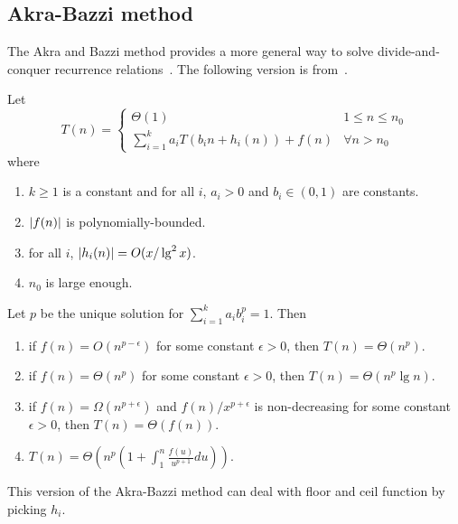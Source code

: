\subsection{Akra\--Bazzi method}
The Akra and Bazzi method provides a more general way to solve divide-and-conquer recurrence relations~\cite{Akra1998}. The following version is from~\cite{Leighton1996}.
\begin{theorem}
Let \[T(n) = 
\begin{cases}
\Theta(1)& 1 \leq n \leq n_0 \\
\sum_{i=1}^k a_iT(b_in +h_i(n)) + f(n) &\forall n > n_0
\end{cases}\]
where
\begin{enumerate}
\item $k \geq 1$ is a constant and for all $i$, $a_i > 0$ and $b_i \in (0, 1)$ are constants.
\item $\lvert f(n)\rvert$ is polynomially-bounded.
\item for all $i$, $\lvert h_i(n)\rvert = O(x /\lg^2x)$.
\item $n_0$ is large enough.
\end{enumerate}
Let $p$ be the unique solution for $\sum_{i=1}^k a_ib_i^p = 1$. Then
\begin{enumerate}
\item if $f(n) = O(n^{p-\epsilon})$ for some constant $\epsilon > 0$, then $T(n) = \Theta(n^p)$.
\item if $f(n) = \Theta(n^{p})$ for some constant $\epsilon > 0$, then $T(n) = \Theta(n^p \lg n)$.
\item if $f(n) = \Omega(n^{p+\epsilon})$ and $f(n)/x^{p+\epsilon}$ is non-decreasing for some constant $\epsilon > 0$, then $T(n) = \Theta(f(n))$.
\item $T(n) = \Theta\left(n^p\left(1 + \int_1^n \frac{f(u)}{u^{p+1}}du\right)\right)$.
\end{enumerate}
\end{theorem}

\begin{remark}
This version of the Akra\--Bazzi method can deal with floor and ceil function by picking $h_i$.
\end{remark}

